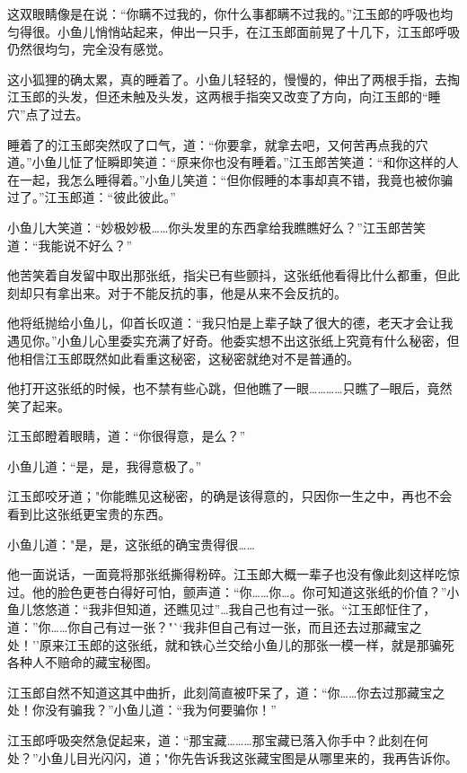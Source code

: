 \documentclass[12pt,oneside]{book}
\begin{document}
这双眼睛像是在说：``你瞒不过我的，你什么事都瞒不过我的。''江玉郎的呼吸也均匀得很。小鱼儿悄悄站起来，伸出一只手，在江玉郎面前晃了十几下，江玉郎呼吸仍然很均匀，完全没有感觉。

这小狐狸的确太累，真的睡着了。小鱼儿轻轻的，慢慢的，伸出了两根手指，去掏江玉郎的头发，但还未触及头发，这两根手指突又改变了方向，向江玉郎的``睡穴''点了过去。

睡着了的江玉郎突然叹了口气，道：``你要拿，就拿去吧，又何苦再点我的穴道。''小鱼儿怔了怔瞬即笑道：``原来你也没有睡着。''江玉郎苦笑道：``和你这样的人在一起，我怎么睡得着。''小鱼儿笑道：``但你假睡的本事却真不错，我竟也被你骗过了。''江玉郎道：``彼此彼此。''

小鱼儿大笑道：``妙极妙极\ldots\ldots 你头发里的东西拿给我瞧瞧好么？''江玉郎苦笑道：``我能说不好么？''

他苦笑着自发留中取出那张纸，指尖已有些颤抖，这张纸他看得比什么都重，但此刻却只有拿出来。对于不能反抗的事，他是从来不会反抗的。

他将纸抛给小鱼儿，仰首长叹道：``我只怕是上辈子缺了很大的德，老天才会让我遇见你。''小鱼儿心里委实充满了好奇。他委实想不出这张纸上究竟有什么秘密，但他相信江玉郎既然如此看重这秘密，这秘密就绝对不是普通的。

他打开这张纸的时候，也不禁有些心跳，但他瞧了一眼\ldots\ldots\ldots\ldots 只瞧了─眼后，竟然笑了起来。

江玉郎瞪着眼睛，道：``你很得意，是么？''

小鱼儿道：``是，是，我得意极了。''

江玉郎咬牙道；"你能瞧见这秘密，的确是该得意的，只因你一生之中，再也不会看到比这张纸更宝贵的东西。

小鱼儿道："是，是，这张纸的确宝贵得很\ldots\ldots{}

他一面说话，一面竟将那张纸撕得粉碎。江玉郎大概一辈子也没有像此刻这样吃惊过。他的脸色更苍白得好可怕，颤声道：``你\ldots\ldots 你\ldots。你可知道这张纸的价值？''小鱼儿悠悠道：``我非但知道，还瞧见过''\ldots 我自己也有过一张。``江玉郎怔住了，道：''你\ldots\ldots 你自己有过一张？"``我非但自己有过一张，而且还去过那藏宝之处！''原来江玉郎的这张纸，就和铁心兰交给小鱼儿的那张一模一样，就是那骗死各种人不赔命的藏宝秘图。

江玉郎自然不知道这其中曲折，此刻简直被吓呆了，道：``你\ldots\ldots 你去过那藏宝之处！你没有骗我？''小鱼儿道：``我为何要骗你！''

江玉郎呼吸突然急促起来，道：``那宝藏\ldots\ldots\ldots 那宝藏已落入你手中？此刻在何处？''小鱼儿目光闪闪，道；"你先告诉我这张藏宝图是从哪里来的，我再告诉你。
\end{document}
